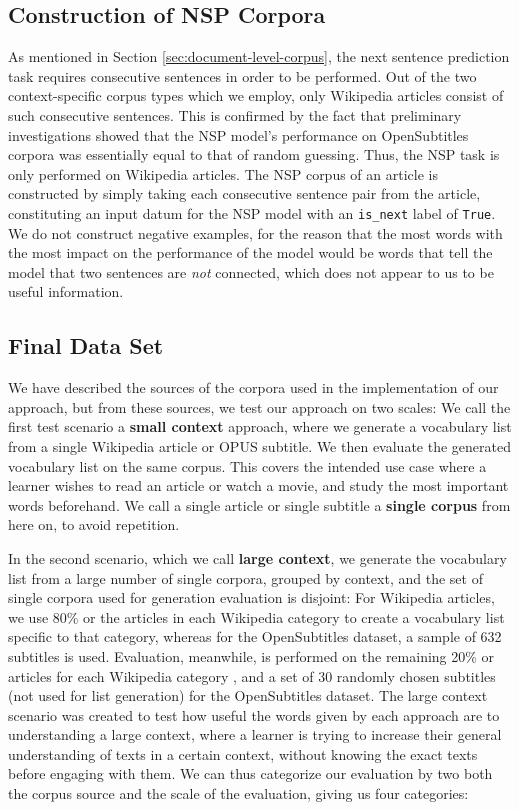 \subsection{Construction of NSP Corpora}
As mentioned in Section \ref{sec:document-level-corpus}, the next sentence prediction task requires consecutive sentences in order to be performed.
Out of the two context-specific corpus types which we employ, only Wikipedia articles consist of such consecutive sentences.
This is confirmed by the fact that preliminary investigations showed that the NSP model's performance on OpenSubtitles corpora was essentially equal to that of random guessing.
Thus, the NSP task is only performed on Wikipedia articles.
The NSP corpus of an article is constructed by simply taking each consecutive sentence pair from the article, constituting an input datum for the NSP model with an \texttt{is\_next} label of \texttt{True}.
We do not construct negative examples, for the reason that the most words with the most impact on the performance of the model would be words that tell the model that two sentences are \textit{not} connected, which does not appear to us to be useful information.

\subsection{Final Data Set} \label{sec:corpus-characteristics}
We have described the sources of the corpora used in the implementation of our approach, but from these sources, we test our approach on two scales:
We call the first test scenario a \textbf{small context} approach, where we generate a vocabulary list from a single Wikipedia article or OPUS subtitle.
We then evaluate the generated vocabulary list on the same corpus.
This covers the intended use case where a learner wishes to read an article or watch a movie, and study the most important words beforehand.
We call a single article or single subtitle a \textbf{single corpus} from here on, to avoid repetition.

In the second scenario, which we call \textbf{large context}, we generate the vocabulary list from a large number of single corpora, grouped by context, and the set of single corpora used for generation evaluation is disjoint:
For Wikipedia articles, we use 80\% or the articles in each Wikipedia category to create a vocabulary list specific to that category, whereas for the OpenSubtitles dataset, a sample of 632 subtitles is used.
Evaluation, meanwhile, is performed on the remaining 20\% or articles for each Wikipedia category , and a set of 30 randomly chosen subtitles (not used for list generation) for the OpenSubtitles dataset.
The large context scenario was created to test how useful the words given by each approach are to understanding a large context, where a learner is trying to increase their general understanding of texts in a certain context, without knowing the exact texts before engaging with them.
We can thus categorize our evaluation by two both the corpus source and the scale of the evaluation, giving us four categories:


